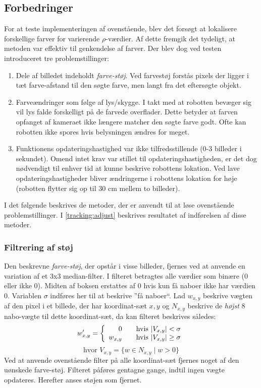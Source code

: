 \subsection{Forbedringer}\label{tracking:improvements}
For at teste implementeringen af ovenstående, blev det forsøgt at lokalisere forskellige farver for varierende $\rho$-værdier.
Af dette fremgik det tydeligt, at metoden var effektiv til genkendelse af farver.
Der blev dog ved testen introduceret tre problemstillinger:
\begin{enumerate}
\item Dele af billedet indeholdt \emph{farve-støj}.
Ved farvestøj forstås pixels der ligger i tæt farve-afstand til den søgte farve, men langt fra det eftersøgte objekt.
\item Farveændringer som følge af lys/skygge.
I takt med at robotten bevæger sig vil lys falde forskelligt på de farvede overflader.
Dette betyder at farven opfanget af kameraet ikke længere matcher den søgte farve godt.
Ofte kan robotten ikke spores hvis belysningen ændres for meget.
\item Funktionens opdateringshastighed var ikke tilfredsstillende (0-3 billeder i sekundet).
Omend intet krav var stillet til opdateringshastigheden, er det dog nødvendigt til enhver tid at kunne beskrive robottens lokation.
Ved lave opdateringshastigheder bliver ændringerne i robottens lokation for høje (robotten flytter sig op til 30 cm mellem to billeder).
\end{enumerate}

I det følgende beskrives de metoder, der er anvendt til at løse ovenstående problemstillinger.
I \cref{tracking:adjust} beskrives resultatet af indførelsen af disse metoder.

\subsubsection{Filtrering af støj}
Den beskrevne \emph{farve-støj}, der opstår i visse billeder, fjernes ved at anvende en variation af et 3x3 median-filter\cite{medianfilter}.
I filteret betragtes alle værdier som binære (0 eller ikke 0).
Midten af boksen erstattes af 0 hvis kun få naboer ikke har værdien 0.
Variablen $\sigma$ indføres her til at beskrive ''få naboer``.
Lad $w_{x,y}$ beskrive vægten af den pixel i et billede, der har koordinat-sæt $x,y$ og $N_{x,y}$ beskrive de \emph{højst} 8 nabo-vægte til dette koordinat-sæt, da kan filteret beskrives således:
\begin{equation}\label{tracking:eq:filter}
w_{x,y}' = \left\{ 
  \begin{array}{r l}
        0 & \quad \text{hvis $|V_{x,y}| < \sigma$} \\
        w_{x,y} & \quad \text{hvis $|V_{x,y}| \geq \sigma$}
  \end{array} \right.
\end{equation}
$$\text{hvor } V_{x,y} = \{ w \in N_{x,y} \mid w > 0 \}$$
Ved at anvende ovenstående filter på alle koordinat-sæt fjernes noget af den uønskede farve-støj.
Filteret påføres gentagne gange, indtil ingen vægte opdateres.
Herefter anses støjen som fjernet.

